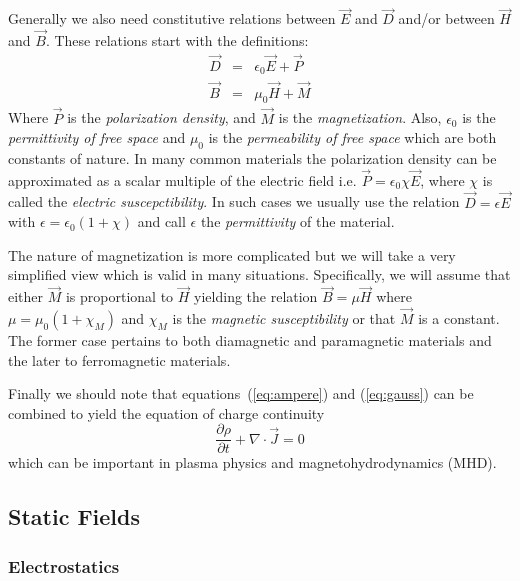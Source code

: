 \documentclass{article}
\newcommand{\refEq}[1]{(\ref{eq:#1})}
\newcommand{\Div}{\nabla\!\cdot\!}
\begin{document}
Generally we also need constitutive relations between $\vec{E}$ and
$\vec{D}$ and/or between $\vec{H}$ and $\vec{B}$.  These relations
start with the definitions:
\begin{eqnarray}
\vec{D} &=& \epsilon_0\vec{E} + \vec{P}\\
\vec{B} &=& \mu_0\vec{H} + \vec{M}
\end{eqnarray}
Where $\vec{P}$ is the {\em polarization density}, and $\vec{M}$ is
the {\em magnetization}.  Also, $\epsilon_0$ is the {\em permittivity
  of free space} and $\mu_0$ is the {\em permeability of free space}
which are both constants of nature.  In many common materials the
polarization density can be approximated as a scalar multiple of the
electric field i.e. $\vec{P}=\epsilon_0\chi\vec{E}$, where $\chi$ is
called the {\em electric suscepctibility}.  In such cases we usually
use the relation $\vec{D}=\epsilon\vec{E}$ with
$\epsilon=\epsilon_0(1+\chi)$ and call $\epsilon$ the {\em
  permittivity} of the material.

The nature of magnetization is more
complicated but we will take a very simplified view which is valid in
many situations.  Specifically, we will assume that either $\vec{M}$
is proportional to $\vec{H}$ yielding the relation
$\vec{B}=\mu\vec{H}$ where $\mu=\mu_0(1+\chi_M)$ and $\chi_M$ is the
{\em magnetic susceptibility} or that $\vec{M}$ is a constant.  The
former case pertains to both diamagnetic and paramagnetic materials
and the later to ferromagnetic materials.

Finally we should note that equations~\refEq{ampere} and \refEq{gauss}
can be combined to yield the equation of charge continuity
\[\frac{\partial\rho}{\partial t}+\Div\vec{J} = 0\]
which can be important in plasma physics and magnetohydrodynamics (MHD).

\subsection{Static Fields}
\subsubsection{Electrostatics}
\end{document}
